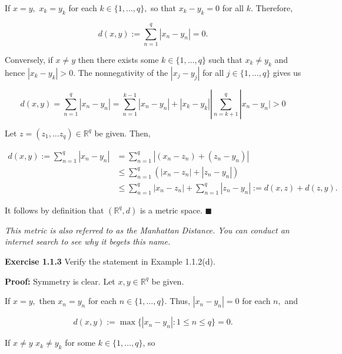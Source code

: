 \documentclass{article}
\begin{document}
If $x=y,$ $x_k=y_k$ for each $k\in \{1,\dots,q\},$ so that $x_k-y_k=0$ for all $k.$ Therefore,

\begin{equation*}
    d(x,y):=\sum_{n=1}^q|x_n-y_n|=0.
\end{equation*}

Conversely, if $x\neq y$ then there exists some $k\in \{1,\dots ,q\}$ such that $x_k\neq y_k$ and hence $|x_k-y_k|>0$. The nonnegativity of the $|x_j-y_j|$ for all $j\in \{1,\dots,q\}$ gives us 

\begin{equation*}
    d(x,y)=\sum_{n=1}^q|x_n-y_n|=\sum_{n=1}^{k-1}|x_n-y_n|+|x_k-y_k||\sum_{n=k+1}^q |x_n-y_n|>0
\end{equation*}

Let $z=(z_1,\dots z_q)\in \mathbb{R}^q$ be given. Then, 

\begin{align*}
    d(x,y):=\sum_{n=1}^q|x_n-y_n|&=\sum_{n=1}^q|(x_n-z_n)+(z_n-y_n)|\\
    &\leq \sum_{n=1}^q\left(|x_n-z_n|+|z_n-y_n|\right)\\
    &\leq \sum_{n=1}^q|x_n-z_n|+\sum_{n=1}^q|z_n-y_n|:=d(x,z)+d(z,y).
\end{align*}

It follows by definition that $(\mathbb{R}^q,d)$ is a metric space. $\blacksquare$

\begin{tcolorbox}[opacitybacktitle=0.25, colback=yellow!20!white,colframe=blue!70!green,title={Remark:}]
\textit{  This metric is also referred to as the Manhattan Distance. You can conduct an internet search to see why it begets this name.}
\end{tcolorbox}
  
\newpage

\begin{tcolorbox}
    \textbf{Exercise 1.1.3} Verify the statement in Example 1.1.2(d).
\end{tcolorbox}

\textbf{Proof:} Symmetry is clear. Let $x,y\in \mathbb{R}^q$ be given.

If $x=y,$ then $x_n=y_n$ for each $n\in \{1,\dots,q\}.$ Thus, $|x_n-y_n|=0$ for each $n,$ and 

\begin{equation*}
    d(x,y):=\max\{|x_n-y_n|:1\leq n\leq q\}=0.
\end{equation*}

If $x\neq y$ $x_k\neq y_k$ for some $k\in \{1,\dots,q\}$, so 
\end{document}
